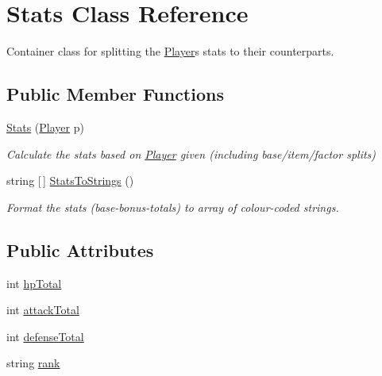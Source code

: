 \hypertarget{class_stats}{}\section{Stats Class Reference}
\label{class_stats}


Container class for splitting the \mbox{\hyperlink{class_player}{Player}}\textquotesingle{}s stats to their counterparts.  


\subsection*{Public Member Functions}
\begin{DoxyCompactItemize}
\item 
\mbox{\hyperlink{class_stats_af8606e198097e115c6ee9e1de60af34c}{Stats}} (\mbox{\hyperlink{class_player}{Player}} p)
\begin{DoxyCompactList}\small\item\em Calculate the stats based on \mbox{\hyperlink{class_player}{Player}} given (including base/item/factor splits) \end{DoxyCompactList}\item 
string \mbox{[}$\,$\mbox{]} \mbox{\hyperlink{class_stats_acae5dda69cd0f8843eed4d72e16284e6}{Stats\+To\+Strings}} ()
\begin{DoxyCompactList}\small\item\em Format the stats (base-\/bonus-\/totals) to array of colour-\/coded strings. \end{DoxyCompactList}\end{DoxyCompactItemize}
\subsection*{Public Attributes}
\begin{DoxyCompactItemize}
\item 
int \mbox{\hyperlink{class_stats_a75af420cf8465d711baf721ef1083a2c}{hp\+Total}}
\item 
int \mbox{\hyperlink{class_stats_aa3e2196b41e9ea3828ba4d4900764c6d}{attack\+Total}}
\item 
int \mbox{\hyperlink{class_stats_a8e4e1c7414832b73710811711afb1203}{defense\+Total}}
\item 
string \mbox{\hyperlink{class_stats_a674f883d2ae3a54728674ba9a88991a2}{rank}}
\end{DoxyCompactItemize}
